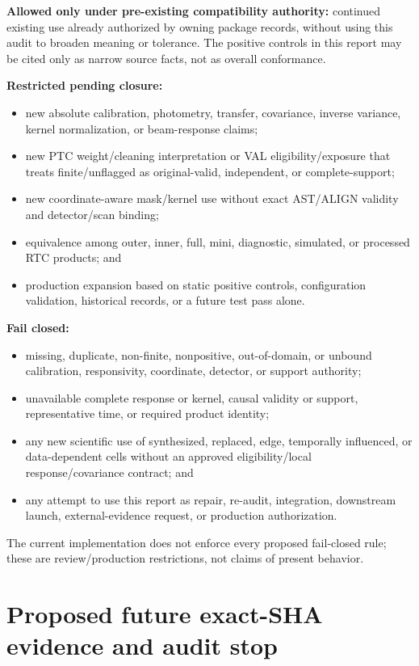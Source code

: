 \documentclass[11pt]{article}
\begin{document}
\textbf{Allowed only under pre-existing compatibility authority:}
continued existing use already authorized by owning package records, without
using this audit to broaden meaning or tolerance.  The positive controls in
this report may be cited only as narrow source facts, not as overall
conformance.

\textbf{Restricted pending closure:}
\begin{itemize}
\item new absolute calibration, photometry, transfer, covariance, inverse
variance, kernel normalization, or beam-response claims;
\item new PTC weight/cleaning interpretation or VAL eligibility/exposure that
treats finite/unflagged as original-valid, independent, or complete-support;
\item new coordinate-aware mask/kernel use without exact AST/ALIGN validity and
detector/scan binding;
\item equivalence among outer, inner, full, mini, diagnostic, simulated, or
processed RTC products; and
\item production expansion based on static positive controls, configuration
validation, historical records, or a future test pass alone.
\end{itemize}

\textbf{Fail closed:}
\begin{itemize}
\item missing, duplicate, non-finite, nonpositive, out-of-domain, or unbound
calibration, responsivity, coordinate, detector, or support authority;
\item unavailable complete response or kernel, causal validity or support,
representative time, or required product identity;
\item any new scientific use of synthesized, replaced, edge, temporally
influenced, or data-dependent cells without an approved eligibility/local
response/covariance contract; and
\item any attempt to use this report as repair, re-audit, integration,
downstream launch, external-evidence request, or production authorization.
\end{itemize}

The current implementation does not enforce every proposed fail-closed rule;
these are review/production restrictions, not claims of present behavior.

\section{Proposed future exact-SHA evidence and audit stop}
\end{document}
